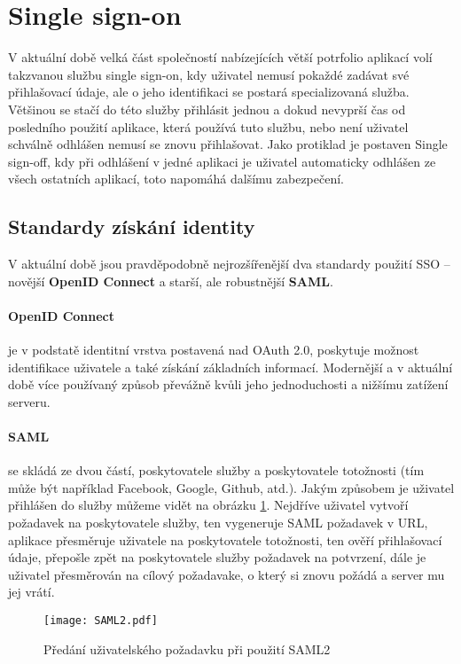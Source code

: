 \section{Single sign-on}
\par V aktuální době velká část společností nabízejících větší potrfolio aplikací volí takzvanou službu single sign-on, kdy uživatel nemusí pokaždé zadávat své přihlašovací údaje, ale o jeho identifikaci se postará specializovaná služba. Většinou se stačí do této služby přihlásit jednou a dokud nevyprší čas od posledního použití aplikace, která používá tuto službu, nebo není uživatel schválně  odhlášen nemusí se znovu přihlašovat. Jako protiklad je postaven Single sign-off, kdy při odhlášení v jedné aplikaci je uživatel automaticky odhlášen ze všech ostatních aplikací, toto napomáhá dalšímu zabezpečení.

\subsection{Standardy získání identity}
\par V aktuální době jsou pravděpodobně nejrozšířenější dva standardy použití SSO -- novější \textbf{OpenID Connect} a starší, ale robustnější \textbf{SAML}.
\paragraph{OpenID Connect} je v podstatě identitní vrstva postavená nad OAuth 2.0, poskytuje možnost identifikace uživatele a také získání základních informací. Modernější a v aktuální době více používaný způsob převážně kvůli jeho jednoduchosti a nižšímu zatížení serveru. \cite{oidc}

\paragraph{SAML} se skládá ze dvou částí, poskytovatele služby a poskytovatele totožnosti (tím může být například Facebook, Google, Github, atd.). Jakým způsobem je uživatel přihlášen do služby můžeme vidět na obrázku \ref{saml2}. Nejdříve uživatel vytvoří požadavek na poskytovatele služby, ten vygeneruje SAML požadavek v URL, aplikace přesměruje uživatele na poskytovatele totožnosti, ten ověří přihlašovací údaje, přepošle zpět na poskytovatele služby požadavek na potvrzení, dále je uživatel přesměrován na cílový požadavake, o který si znovu požádá a server mu jej vrátí. \cite{saml}
\begin{figure}[hp]
  \centering
  \texttt{[image: SAML2.pdf]}
  \caption{Předání uživatelského požadavku při použití SAML2}
  \label{saml2}
\end{figure}

